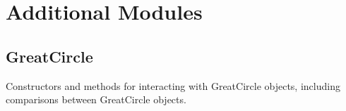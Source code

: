 \documentclass[letterpaper,10pt,english]{sphinxmanual}
\begin{document}
\sphinxstepscope


\chapter{Additional Modules}
\label{\detokenize{users_guide:module-geotrees.great_circle}}\label{\detokenize{users_guide:additional-modules}}\label{\detokenize{users_guide::doc}}

\section{GreatCircle}
\label{\detokenize{users_guide:greatcircle}}
\sphinxAtStartPar
Constructors and methods for interacting with GreatCircle objects, including
comparisons between GreatCircle objects.
\end{document}

